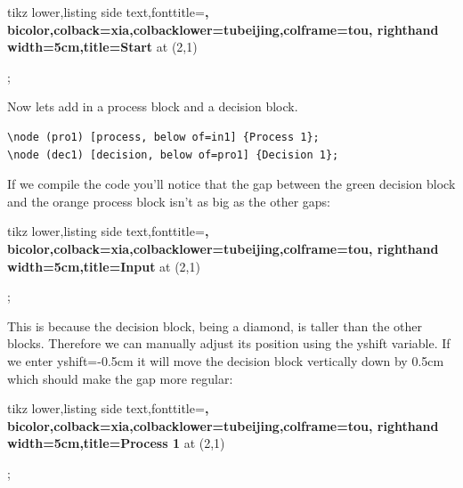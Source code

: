 \documentclass[cn,11pt, simple]{elegantbook}
\begin{document}
\begin{tcblisting}{tikz lower,listing side text,fonttitle=\bfseries,
	bicolor,colback=xia,colbacklower=tubeijing,colframe=tou,
	righthand width=5cm,title=Start}
\node at (2,1){   %
};
\end{tcblisting}

Now lets add in a process block and a decision block.

\begin{verbatim}
\node (pro1) [process, below of=in1] {Process 1};
\node (dec1) [decision, below of=pro1] {Decision 1};
\end{verbatim}

If we compile the code you'll notice that the gap between the green decision block and the orange process block isn't as big as the other gaps:

\begin{tcblisting}{tikz lower,listing side text,fonttitle=\bfseries,
	bicolor,colback=xia,colbacklower=tubeijing,colframe=tou,
	righthand width=5cm,title=Input}
\node at (2,1){   %
};
\end{tcblisting}

This is because the decision block, being a diamond, is taller than the other blocks. Therefore we can manually adjust its position using the yshift variable. If we enter yshift=-0.5cm it will move the decision block vertically down by 0.5cm which should make the gap more regular:

\begin{tcblisting}{tikz lower,listing side text,fonttitle=\bfseries,
	bicolor,colback=xia,colbacklower=tubeijing,colframe=tou,
	righthand width=5cm,title=Process 1}
\node at (2,1){    %
 };
\end{tcblisting}
\end{document}
